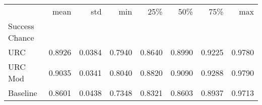 \begin{tabular}{lrrrrrrr}
\toprule
 & mean & std & min & 25\% & 50\% & 75\% & max \\
Success Chance &  &  &  &  &  &  &  \\
\midrule
URC & 0.8926 & 0.0384 & 0.7940 & 0.8640 & 0.8990 & 0.9225 & 0.9780 \\
URC Mod & 0.9035 & 0.0341 & 0.8040 & 0.8820 & 0.9090 & 0.9288 & 0.9790 \\
Baseline & 0.8601 & 0.0438 & 0.7348 & 0.8321 & 0.8603 & 0.8937 & 0.9713 \\
\bottomrule
\end{tabular}
